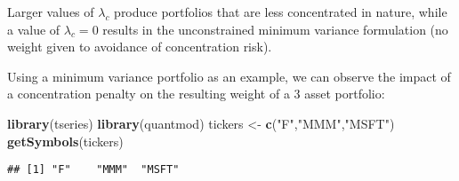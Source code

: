 \documentclass[]{book}
\newenvironment{Shaded}{\begin{snugshade}}{\end{snugshade}}
\newcommand{\KeywordTok}[1]{\textcolor[rgb]{0.13,0.29,0.53}{\textbf{#1}}}
\newcommand{\StringTok}[1]{\textcolor[rgb]{0.31,0.60,0.02}{#1}}
\newcommand{\NormalTok}[1]{#1}
\theoremstyle{definition}
\theoremstyle{definition}
\theoremstyle{definition}
\theoremstyle{remark}
\begin{document}
Larger values of \(\lambda_c\) produce portfolios that are less
concentrated in nature, while a value of \(\lambda_c = 0\) results in
the unconstrained minimum variance formulation (no weight given to
avoidance of concentration risk).

Using a minimum variance portfolio as an example, we can observe the
impact of a concentration penalty on the resulting weight of a 3 asset
portfolio:

\begin{Shaded}
\begin{Highlighting}[]
\KeywordTok{library}\NormalTok{(tseries)}
\KeywordTok{library}\NormalTok{(quantmod)}
\NormalTok{tickers <-}\StringTok{ }\KeywordTok{c}\NormalTok{(}\StringTok{"F"}\NormalTok{,}\StringTok{"MMM"}\NormalTok{,}\StringTok{"MSFT"}\NormalTok{)}
\KeywordTok{getSymbols}\NormalTok{(tickers)}
\end{Highlighting}
\end{Shaded}

\begin{verbatim}
## [1] "F"    "MMM"  "MSFT"
\end{verbatim}
\end{document}

